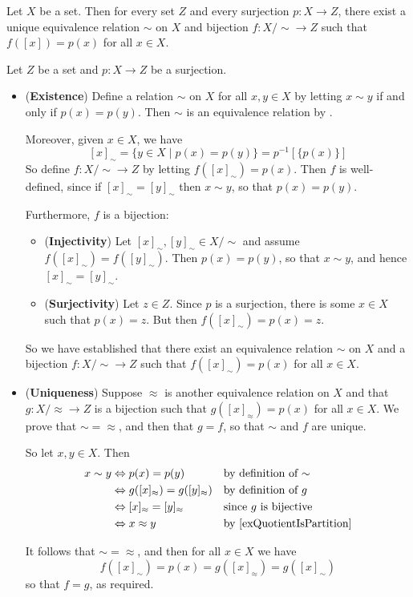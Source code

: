 \begin{theorem}
\label{thmEquivalenceRelationsSurjections}
Let $X$ be a set. Then for every set $Z$ and every surjection $p : X \to Z$, there exist a unique equivalence relation $\sim$ on $X$ and bijection $f : X/{\sim} \to Z$ such that $f([x]) = p(x)$ for all $x \in X$.
\end{theorem}

\begin{cproof}
Let $Z$ be a set and $p : X \to Z$ be a surjection.
\begin{itemize}
\item (\textbf{Existence}) Define a relation $\sim$ on $X$ for all $x,y \in X$ by letting $x \sim y$ if and only if $p(x) = p(y)$. Then $\sim$ is an equivalence relation by .

Moreover, given $x \in X$, we have
\[ [x]_{\sim} = \{ y \in X \mid p(x) = p(y) \} = p^{-1}[\{p(x)\}] \]
So define $f : X/{\sim} \to Z$ by letting $f([x]_{\sim}) = p(x)$. Then $f$ is well-defined, since if $[x]_{\sim} = [y]_{\sim}$ then $x \sim y$, so that $p(x)=p(y)$.

Furthermore, $f$ is a bijection:
\begin{itemize}
\item (\textbf{Injectivity}) Let $[x]_{\sim},[y]_{\sim} \in X/{\sim}$ and assume $f([x]_{\sim}) = f([y]_{\sim})$. Then $p(x)=p(y)$, so that $x \sim y$, and hence $[x]_{\sim} = [y]_{\sim}$.
\item (\textbf{Surjectivity}) Let $z \in Z$. Since $p$ is a surjection, there is some $x \in X$ such that $p(x) = z$. But then $f([x]_{\sim}) = p(x) = z$.
\end{itemize}
So we have established that there exist an equivalence relation $\sim$ on $X$ and a bijection $f : X/{\sim} \to Z$ such that $f([x]_{\sim}) = p(x)$ for all $x \in X$.

\item (\textbf{Uniqueness}) Suppose $\approx$ is another equivalence relation on $X$ and that $g : X/{\approx} \to Z$ is a bijection such that $g([x]_{\approx}) = p(x)$ for all $x \in X$. We prove that ${\sim} = {\approx}$, and then that $g = f$, so that $\sim$ and $f$ are unique.

So let $x,y \in X$. Then
\begin{align*}
x \sim y
&\Leftrightarrow p(x) = p(y) && \text{by definition of $\sim$} \\
&\Leftrightarrow g([x]_{\approx}) = g([y]_{\approx}) && \text{by definition of $g$} \\
&\Leftrightarrow [x]_{\approx} = [y]_{\approx} && \text{since $g$ is bijective} \\
&\Leftrightarrow x \approx y && \text{by \Cref{exQuotientIsPartition}}
\end{align*}

It follows that ${\sim} = {\approx}$, and then for all $x \in X$ we have
\[ f([x]_{\sim}) = p(x) = g([x]_{\approx}) = g([x]_{\sim}) \]
so that $f=g$, as required.
\end{itemize}
\end{cproof}

